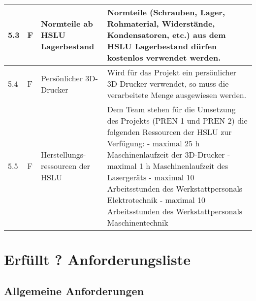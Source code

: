 \documentclass[main.tex]{subfiles} %
\begin{document}
\begin{tabular}{|l|p{0.5cm}|p{4cm}|p{10cm}|}
  \hline
  5.3          & F          & Normteile ab HSLU Lagerbestand   & Normteile (Schrauben, Lager, Rohmaterial, Widerstände, Kondensatoren, etc.) aus dem HSLU Lagerbestand dürfen kostenlos verwendet werden.                                                                                                                                                                                                                                                      \\
  \hline
  5.4          & F          & Persönlicher 3D-Drucker          & Wird für das Projekt ein persönlicher 3D-Drucker verwendet, so muss die verarbeitete Menge ausgewiesen werden.                                                                                                                                                                                                                                                                                \\
  \hline
  5.5          & F          & Herstellungs-ressourcen der HSLU & Dem Team stehen für die Umsetzung des Projekts (PREN 1 und PREN 2) die folgenden Ressourcen der HSLU zur Verfügung: \newline - maximal 25 h Maschinenlaufzeit der 3D-Drucker \newline - maximal 1 h Maschinenlaufzeit des Lasergeräts \newline - maximal 10 Arbeitsstunden des Werkstattpersonals Elektrotechnik \newline - maximal 10 Arbeitsstunden des Werkstattpersonals Maschinentechnik \\
  \hline
\end{tabular}

\newpage

\section{Erfüllt ? Anforderungsliste}

\subsection*{Allgemeine Anforderungen}
\end{document}
